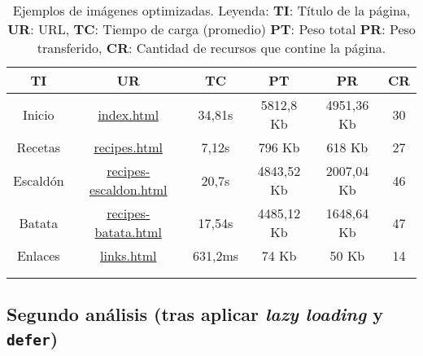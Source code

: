 \documentclass{article}
\begin{document}
\begin{longtable}{c|c|c|c|c|c}
    \hline
    \textbf{TI} & \textbf{UR} & \textbf{TC} & \textbf{PT} & \textbf{PR} & \textbf{CR} \\
    \endhead
    \hline
    Inicio & \href{https://www.danielramos.me/hhyc-dramosac/index.html}{index.html} & 34,81s & 5812,8 Kb & 4951,36 Kb & 30 \\
    Recetas & \href{https://www.danielramos.me/hhyc-dramosac/recipes.html}{recipes.html} & 7,12s & 796 Kb & 618 Kb & 27 \\
    Escaldón & \href{https://www.danielramos.me/hhyc-dramosac/recipes-escaldon.html}{recipes-escaldon.html} & 20,7s & 4843,52 Kb & 2007,04 Kb & 46 \\
    Batata & \href{https://www.danielramos.me/hhyc-dramosac/recipes-batata.html}{recipes-batata.html} & 17,54s & 4485,12 Kb & 1648,64 Kb & 47 \\
    Enlaces & \href{https://www.danielramos.me/hhyc-dramosac/links.html}{links.html} & 631,2ms & 74 Kb & 50 Kb & 14 \\
    \hline
     \\[1.5ex]
     \caption{
          Ejemplos de imágenes optimizadas.
          Leyenda: 
          \textbf{TI}: Título de la página, 
          \textbf{UR}: URL, 
          \textbf{TC}: Tiempo de carga (promedio) 
          \textbf{PT}: Peso total 
          \textbf{PR}: Peso transferido, 
          \textbf{CR}: Cantidad de recursos que contine la página.
     }
    \label{tab:imagenes-optimizadas}
\end{longtable}

\subsection{Segundo análisis (tras aplicar \textit{lazy loading} y \texttt{defer})}\label{sec:segundo-analisis}
\end{document}
